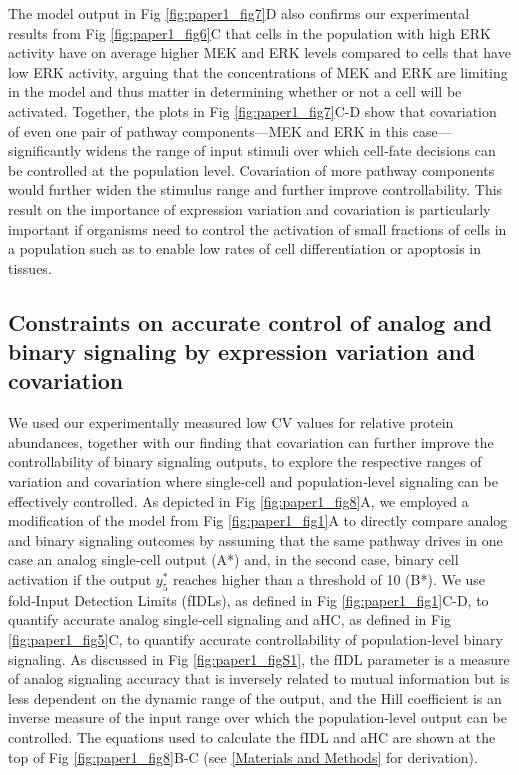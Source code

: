 The model output in Fig \ref{fig:paper1_fig7}D also confirms our experimental results from Fig \ref{fig:paper1_fig6}C that cells in the population with high ERK activity have on average higher MEK and ERK levels compared to cells that have low ERK activity, arguing that the concentrations of MEK and ERK are limiting in the model and thus matter in determining whether or not a cell will be activated. Together, the plots in Fig \ref{fig:paper1_fig7}C-D show that covariation of even one pair of pathway components—MEK and ERK in this case—significantly widens the range of input stimuli over which cell‐fate decisions can be controlled at the population level. Covariation of more pathway components would further widen the stimulus range and further improve controllability. This result on the importance of expression variation and covariation is particularly important if organisms need to control the activation of small fractions of cells in a population such as to enable low rates of cell differentiation \cite{Ahrends2014} or apoptosis \cite{Spencer2009} in tissues.

\subsection{Constraints on accurate control of analog and binary signaling by expression variation and covariation}

We used our experimentally measured low CV values for relative protein abundances, together with our finding that covariation can further improve the controllability of binary signaling outputs, to explore the respective ranges of variation and covariation where single‐cell and population‐level signaling can be effectively controlled. As depicted in Fig \ref{fig:paper1_fig8}A, we employed a modification of the model from Fig \ref{fig:paper1_fig1}A to directly compare analog and binary signaling outcomes by assuming that the same pathway drives in one case an analog single‐cell output (A*) and, in the second case, binary cell activation if the output $y_5^*$ reaches higher than a threshold of 10 (B*). We use fold‐Input Detection Limits (fIDLs), as defined in Fig \ref{fig:paper1_fig1}C-D, to quantify accurate analog single‐cell signaling and aHC, as defined in Fig \ref{fig:paper1_fig5}C, to quantify accurate controllability of population‐level binary signaling. As discussed in Fig \ref{fig:paper1_figS1}, the fIDL parameter is a measure of analog signaling accuracy that is inversely related to mutual information but is less dependent on the dynamic range of the output, and the Hill coefficient is an inverse measure of the input range over which the population‐level output can be controlled. The equations used to calculate the fIDL and aHC are shown at the top of Fig \ref{fig:paper1_fig8}B-C (see \ref{Materials and Methods} for derivation).

